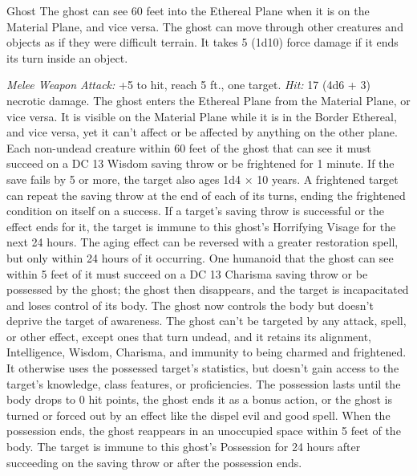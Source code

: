 \documentclass[10pt,a4paper,twoside,twocolumn,openany,bg=none,nodeprecatedcode]{dndbook}
\begin{document}
\begin{DndMonster}[float*=t]{Ghost}
\DndMonsterBasics[
armor-class = {11},
hit-points = {\DndDice{10d8}},
speed = {0 ft., {'number': 40, 'condition': '(hover)'} ft. (key), True ft. (key)}
]
\DndMonsterAbilityScores[
 str = 7,
 dex = 13,
 con = 10,
 int = 10,
 wis = 12,
 cha = 17
]
\DndMonsterDetails[
damage-resistances = {acid, fire, lightning, thunder; bludgeoning, piercing, slashing from nonmagical attacks},
damage-immunities = {cold, necrotic, poison},
senses = {darkvision 60 ft., passive perception 11},
languages = {any languages it knew in life},
challenge = 4,
]
The ghost can see 60 feet into the Ethereal Plane when it is on the Material Plane, and vice versa.
The ghost can move through other creatures and objects as if they were difficult terrain. It takes 5 (1d10) force damage if it ends its turn inside an object.
\par
{}
\textsl{Melee Weapon Attack:} +5 to hit, reach 5 ft., one target. \textsl{Hit:} 17 (4d6 + 3) necrotic damage.
The ghost enters the Ethereal Plane from the Material Plane, or vice versa. It is visible on the Material Plane while it is in the Border Ethereal, and vice versa, yet it can't affect or be affected by anything on the other plane.
Each non-undead creature within 60 feet of the ghost that can see it must succeed on a DC 13 Wisdom saving throw or be frightened for 1 minute. If the save fails by 5 or more, the target also ages 1d4 × 10 years. A frightened target can repeat the saving throw at the end of each of its turns, ending the frightened condition on itself on a success. If a target's saving throw is successful or the effect ends for it, the target is immune to this ghost's Horrifying Visage for the next 24 hours. The aging effect can be reversed with a  greater restoration spell, but only within 24 hours of it occurring.
One humanoid that the ghost can see within 5 feet of it must succeed on a DC 13 Charisma saving throw or be possessed by the ghost; the ghost then disappears, and the target is incapacitated and loses control of its body. The ghost now controls the body but doesn't deprive the target of awareness. The ghost can't be targeted by any attack, spell, or other effect, except ones that turn undead, and it retains its alignment, Intelligence, Wisdom, Charisma, and immunity to being charmed and frightened. It otherwise uses the possessed target's statistics, but doesn't gain access to the target's knowledge, class features, or proficiencies.
The possession lasts until the body drops to 0 hit points, the ghost ends it as a bonus action, or the ghost is turned or forced out by an effect like the dispel evil and good spell. When the possession ends, the ghost reappears in an unoccupied space within 5 feet of the body. The target is immune to this ghost's Possession for 24 hours after succeeding on the saving throw or after the possession ends.
\end{DndMonster}
\end{document}
